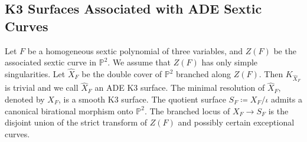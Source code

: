 \documentclass[12pt,reqno,a4paper]{amsart}
\newtheorem{prop}[thm]{Proposition~}
\theoremstyle{remark}
\theoremstyle{definition}
\newcommand{\PP}{\mathbb{P}}
\newcommand{\marg}[1]{\normalsize{{\color{red}\footnote{#1}}}{\marginpar[\vskip -.3cm {\color{red}\hfill\tiny{\thefootnote}\normalsize$\implies$}]{\vskip -.3cm{ \color{red}$\impliedby$\tiny\thefootnote}}}}
\newcommand{\Zhong}[1]{\marg{\color{blue}(Zhong): #1}}
\begin{document}
\subsection{K3 Surfaces Associated with ADE Sextic Curves}
\label{subsection: ADE K3}
Let $F$ be a homogeneous sextic polynomial of three variables, and $Z(F)$ be the associated sextic curve in $\PP^2$.
We assume that $Z(F)$ has only simple singularities.
Let $\widehat{X}_F$ be the double cover of $\PP^2$ branched along $Z(F)$. Then $K_{\widehat{X}_F}$ is trivial and we call $\widehat{X}_F$ an ADE K3 surface.
The minimal resolution of $\widehat{X}_F$, denoted by $X_F$, is a smooth K3 surface. The quotient surface $S_F\coloneqq X_F/\iota$ admits a canonical birational morphism onto $\PP^2$. The branched locus of $X_F\to S_F$ is the disjoint union of the strict transform of $Z(F)$ and possibly certain exceptional curves.%
\end{document}
